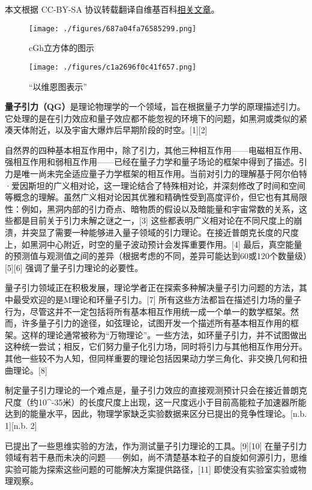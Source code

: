 
本文根据 CC-BY-SA 协议转载翻译自维基百科\href{https://en.wikipedia.org/wiki/Quantum_gravity}{相关文章}。

\begin{figure}[ht]
\centering
\texttt{[image: ./figures/687a04fa76585299.png]}
\caption{cGh立方体的图示} \label{fig_LZYL_1}
\end{figure}
\begin{figure}[ht]
\centering
\texttt{[image: ./figures/c1a2696f0c41f657.png]}
\caption{“以维恩图表示”} \label{fig_LZYL_2}
\end{figure}
\textbf{量子引力（QG）}是理论物理学的一个领域，旨在根据量子力学的原理描述引力。它处理的是在引力效应和量子效应都不能忽视的环境下的问题，如黑洞或类似的紧凑天体附近，以及宇宙大爆炸后早期阶段的时空。[1][2]

自然界的四种基本相互作用中，除了引力，其他三种相互作用——电磁相互作用、强相互作用和弱相互作用——已经在量子力学和量子场论的框架中得到了描述。引力是唯一尚未完全适应量子力学框架的相互作用。当前对引力的理解基于阿尔伯特·爱因斯坦的广义相对论，这一理论结合了特殊相对论，并深刻修改了时间和空间等概念的理解。虽然广义相对论因其优雅和精确性受到高度评价，但它也有其局限性：例如，黑洞内部的引力奇点、暗物质的假设以及暗能量和宇宙常数的关系，这些都是目前关于引力未解之谜之一，[3] 这些都表明广义相对论在不同尺度上的崩溃，并突显了需要一种能够进入量子领域的引力理论。在接近普朗克长度的尺度上，如黑洞中心附近，时空的量子波动预计会发挥重要作用。[4] 最后，真空能量的预测值与观测值之间的差异（根据考虑的不同，差异可能达到60或120个数量级）[5][6] 强调了量子引力理论的必要性。

量子引力领域正在积极发展，理论学者正在探索多种解决量子引力问题的方法，其中最受欢迎的是M理论和环量子引力。[7] 所有这些方法都旨在描述引力场的量子行为，尽管这并不一定包括将所有基本相互作用统一成一个单一的数学框架。然而，许多量子引力的途径，如弦理论，试图开发一个描述所有基本相互作用的框架。这样的理论通常被称为“万物理论”。一些方法，如环量子引力，并不试图做出这种统一尝试；相反，它们努力量子化引力场，同时将引力与其他相互作用分开。其他一些较不为人知，但同样重要的理论包括因果动力学三角化、非交换几何和扭曲理论。[8]

制定量子引力理论的一个难点是，量子引力效应的直接观测预计只会在接近普朗克尺度（约10^-35米）的长度尺度上出现，这一尺度远小于目前高能粒子加速器所能达到的能量水平，因此，物理学家缺乏实验数据来区分已提出的竞争性理论。[n.b. 1][n.b. 2]

已提出了一些思维实验的方法，作为测试量子引力理论的工具。[9][10] 在量子引力领域有若干悬而未决的问题——例如，尚不清楚基本粒子的自旋如何源引力，思维实验可能为探索这些问题的可能解决方案提供路径，[11] 即使没有实验室实验或物理观察。

